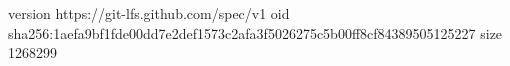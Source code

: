 version https://git-lfs.github.com/spec/v1
oid sha256:1aefa9bf1fde00dd7e2def1573c2afa3f5026275c5b00ff8cf84389505125227
size 1268299
